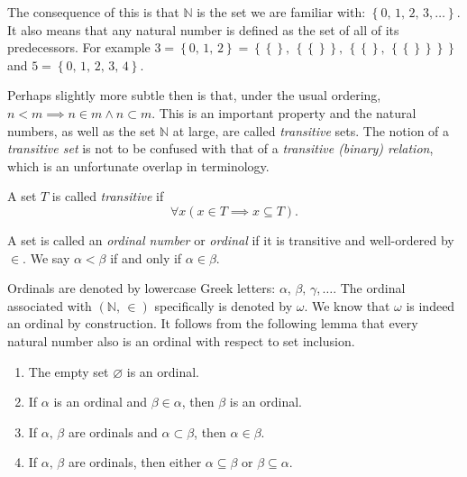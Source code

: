 \documentclass[../../main.tex]{subfiles}
\begin{document}
The consequence of this is that $\mathbb{N}$ is the set we are familiar with: $\left\{0,\, 1,\, 2,\, 3,\ldots\right\}$.
It also means that any natural number is defined as the set of all of its predecessors.
For example $3 = \left\{0,\, 1,\, 2\right\} = \left\{\left\{\right\},\, \left\{\left\{\right\}\right\},\, \left\{\left\{\right\},\, \left\{\left\{\right\}\right\}\right\}\right\}$ and $5 = \left\{0,\, 1,\, 2,\, 3,\, 4\right\}$.

Perhaps slightly more subtle then is that, under the usual ordering, $n < m \implies n \in m \wedge n \subset m$.
This is an important property and the natural numbers, as well as the set $\mathbb{N}$ at large, are called \textit{transitive} sets.
The notion of a \textit{transitive set} is not to be confused with that of a \textit{transitive (binary) relation}, which is an unfortunate overlap in terminology.

\begin{definition}\cite[p.14]{Jec78}
    A set $T$ is called \textit{transitive} if $$\forall x \left(x \in T \implies x \subseteq T\right).$$
\end{definition}

\begin{definition}\cite[p.14]{Jec78}
    A set is called an \textit{ordinal number} or \textit{ordinal} if it is transitive and well-ordered by $\in$.
    We say $\alpha < \beta$ if and only if $\alpha \in \beta$.
\end{definition}

Ordinals are denoted by lowercase Greek letters: $\alpha,\, \beta,\, \gamma,\ldots.$
The ordinal associated with $\left(\mathbb{N},\, \in\right)$ specifically is denoted by $\omega$.
We know that $\omega$ is indeed an ordinal by construction.
It follows from the following lemma that every natural number also is an ordinal with respect to set inclusion.

\begin{lemma}\cite[Lemma 2.3, p.15]{Jec78}
    \begin{enumerate}
        \item The empty set $\varnothing$ is an ordinal.
        \item If $\alpha$ is an ordinal and $\beta \in \alpha$, then $\beta$ is an ordinal.
        \item If $\alpha,\, \beta$ are ordinals and $\alpha \subset \beta$, then $\alpha \in \beta$.
        \item If $\alpha,\, \beta$ are ordinals, then either  $\alpha \subseteq \beta$ or $\beta \subseteq \alpha$.
    \end{enumerate}
\end{lemma}
\end{document}
